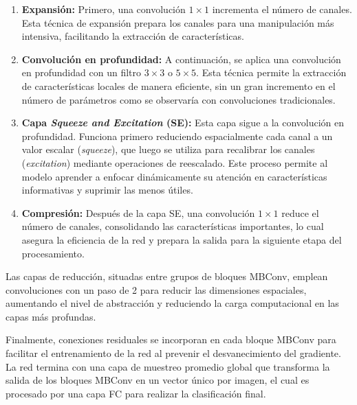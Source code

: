 \begin{enumerate}
	\item \textbf{Expansión:} Primero, una convolución $1 \times 1$ incrementa el número
	de canales. Esta técnica de expansión prepara los canales para una
	manipulación más intensiva, facilitando la extracción de características.
	
	\item \textbf{Convolución en profundidad:} A continuación, se aplica una convolución
	en profundidad con un filtro $3 \times 3$ o $5 \times 5$. Esta técnica
	permite la extracción de características locales de manera eficiente, sin un
	gran incremento en el número de parámetros como se observaría con convoluciones
	tradicionales.
	
	\item \textbf{Capa \textit{Squeeze and Excitation} (SE):} Esta capa sigue a la
	convolución en profundidad. Funciona primero reduciendo espacialmente cada canal
	a un valor escalar (\textit{squeeze}), que luego se utiliza para recalibrar los
	canales (\textit{excitation}) mediante operaciones de reescalado. Este proceso
	permite al modelo aprender a enfocar dinámicamente su atención en características
	informativas y suprimir las menos útiles.
	
	\item \textbf{Compresión:} Después de la capa SE, una convolución $1 \times 1$
	reduce el número de canales, consolidando las características importantes, lo
	cual asegura la eficiencia de la red y prepara la salida para la siguiente etapa
	del procesamiento.
\end{enumerate}

Las capas de reducción, situadas entre grupos de bloques MBConv, emplean
convoluciones con un paso de 2 para reducir las dimensiones espaciales, aumentando
el nivel de abstracción y reduciendo la carga computacional en las capas más profundas.

Finalmente, conexiones residuales se incorporan en cada bloque MBConv para
facilitar el entrenamiento de la red al prevenir el desvanecimiento del
gradiente. La red termina con una capa de muestreo promedio global que transforma
la salida de los bloques MBConv en un vector único por imagen, el cual es
procesado por una capa FC para realizar la clasificación final.


